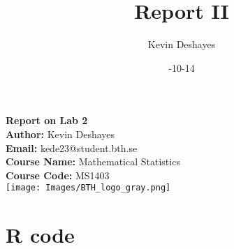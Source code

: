 \documentclass{report}
\title{Report II}
\author{Kevin Deshayes}
\date{\2024-10-14}
\begin{document}
\begin{titlepage}
  \centering
  {\huge\bfseries Report on Lab 2 \\[1cm]}  %
  \textbf{Author:} Kevin Deshayes\\[0.5cm]  %
  \textbf{Email:} kede23@student.bth.se\\[0.5cm]  %
  \textbf{Course Name:} Mathematical Statistics \\[0.5cm]  %
  \textbf{Course Code:} MS1403\\[1.5cm]  %

  \texttt{[image: Images/BTH\_logo\_gray.png]} %
  \vfill
  \vspace{2cm}
\end{titlepage}

\tableofcontents
\newpage
\section{R code}
\end{document}
